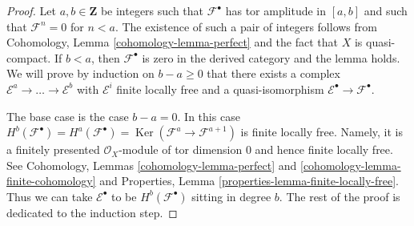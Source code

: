 \documentclass{amsart}
\theoremstyle{plain}
\theoremstyle{definition}
\theoremstyle{remark}
\numberwithin{equation}{subsection}
\def\Ker{\mathop{\mathrm{Ker}}}
\begin{document}
\begin{proof}
Let $a, b \in \mathbf{Z}$ be integers such that $\mathcal{F}^\bullet$
has tor amplitude in $[a, b]$ and such that $\mathcal{F}^n = 0$ for
$n < a$. The existence of such a pair of integers
follows from Cohomology, Lemma \ref{cohomology-lemma-perfect}
and the fact that $X$ is quasi-compact.
If $b < a$, then $\mathcal{F}^\bullet$ is zero in the
derived category and the lemma holds.
We will prove by induction on
$b - a \geq 0$ that there exists a complex
$\mathcal{E}^a \to \ldots \to \mathcal{E}^b$
with $\mathcal{E}^i$ finite locally free
and a quasi-isomorphism $\mathcal{E}^\bullet \to \mathcal{F}^\bullet$.

\medskip\noindent
The base case is the case $b - a = 0$. In this case
$H^b(\mathcal{F}^\bullet) = H^a(\mathcal{F}^\bullet) =
\Ker(\mathcal{F}^a \to \mathcal{F}^{a + 1})$
is finite locally free. Namely, it is a finitely presented
$\mathcal{O}_X$-module of tor dimension $0$ and hence finite
locally free. See Cohomology, Lemmas \ref{cohomology-lemma-perfect} and
\ref{cohomology-lemma-finite-cohomology} and
Properties, Lemma \ref{properties-lemma-finite-locally-free}.
Thus we can take $\mathcal{E}^\bullet$ to be
$H^b(\mathcal{F}^\bullet)$ sitting in degree $b$.
The rest of the proof is dedicated to the induction step.


\end{proof}
\end{document}
